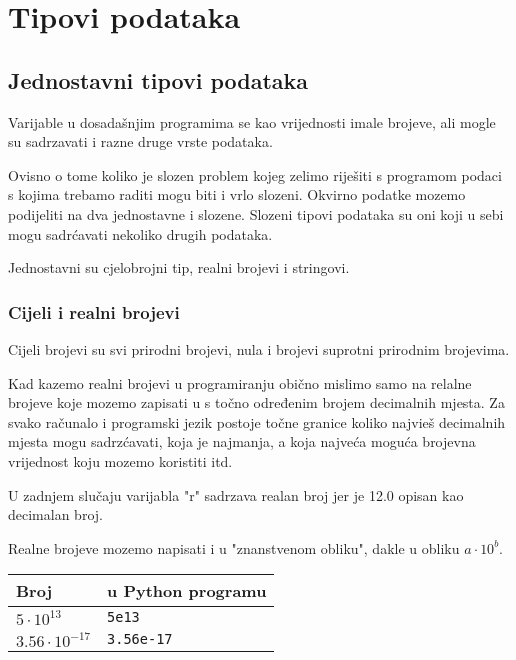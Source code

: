 \chapter{Tipovi podataka}

\section{Jednostavni tipovi podataka}

	Varijable u dosadašnjim programima se kao vrijednosti imale brojeve, ali
	mogle su sadrzavati i razne druge vrste podataka.

	Ovisno o tome koliko je slozen problem kojeg zelimo riješiti s
	programom podaci s kojima trebamo raditi mogu biti i vrlo slozeni. Okvirno
	podatke mozemo podijeliti na dva jednostavne i slozene. Slozeni tipovi
	podataka su oni koji u sebi mogu sadrćavati nekoliko drugih podataka.

	Jednostavni su cjelobrojni tip, realni brojevi i stringovi.

\subsection{Cijeli i realni brojevi}

	Cijeli brojevi su svi prirodni brojevi, nula i brojevi suprotni prirodnim
	brojevima.

	Kad kazemo realni brojevi u programiranju obično mislimo samo na relalne
	brojeve koje mozemo zapisati u s točno određenim brojem decimalnih
	mjesta. Za svako računalo i programski jezik postoje točne granice koliko
	najvieš decimalnih mjesta mogu sadrzćavati, koja je najmanja, a koja
	najveća moguća brojevna vrijednost koju mozemo koristiti itd.


	U zadnjem slučaju varijabla "r" sadrzava realan broj jer je 12.0
	opisan kao decimalan broj. 

	Realne brojeve mozemo napisati i u "znanstvenom obliku", dakle u obliku $a\cdot
	10^{b}$.

	\vspace{3mm}
	\begin{tabular}{l|l}
		Broj & u Python programu\\
		\hline
		$5\cdot 10^{13}$ & \verb+5e13+\\
		$3.56\cdot 10^{-17}$ & \verb+3.56e-17+\\
	\end{tabular}
	\vspace{3mm}

